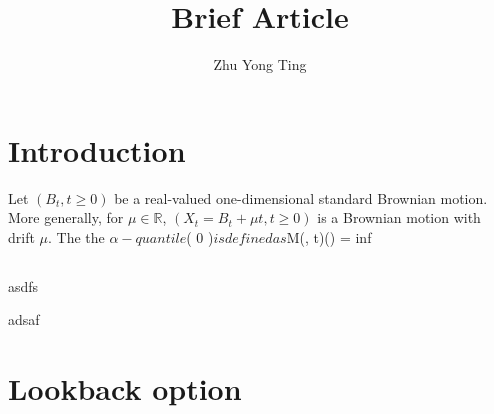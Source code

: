 \documentclass[11pt]{amsart}
\title{Brief Article}
\author{Zhu Yong Ting}
\def\bR{{\mathbb{R}}}
\begin{document}
\maketitle
\section{Introduction}
Let $(B_t, t\geq 0)$  be a real-valued one-dimensional standard Brownian motion. More generally, for $ \mu \in \bR$, $(X_t = B_t + \mu t, t \geq 0)$  is a Brownian motion with drift $\mu$. The the $\alpha -quantile $( 0 \leq \alpha {})$ is defined as $M(\alpha , t)(\omega) = inf 




\subsection{}
asdfs

adsaf


\section{Lookback option}
\end{document}
